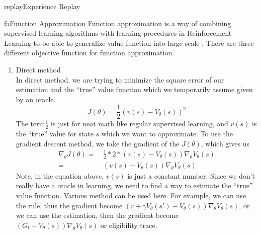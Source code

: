 \documentclass[9pt]{article}
\begin{document}
\begin{topic}{replay}{Experience Replay}
\citep{Vanseijen2015Deeper} \citep{Riedmiller2005Neural}
\end{topic}

\begin{topic}{fa}{Function Approximation}
Function approximation is a way of combining supervised learning algorithms with learning procedures in Reinforcement Learning to be able to generalize value function into large scale . There are three different objective function for function approximation. 
\begin{enumerate}
\item Direct method\\
In direct method, we are trying to minimize the square error of our estimation and the ``true'' value function which we temporarily assume given by an oracle.
\[
J(\theta) = \frac{1}{2}(v(s) - V_{\theta}(s))^2
\]
The term$\frac{1}{2}$ is just for neat math like regular supervised learning, and $v(s)$ is the ``true'' value for state $s$ which we want to approximate. To use the gradient descent method, we take the gradient of the $J(\theta)$, which gives us
\[
\begin{split}
\nabla_{\theta} J(\theta) = &\ \frac{1}{2} * 2 * (v(s) - V_{\theta}(s)) \nabla_{\theta} V_{\theta}(s)\\
= &\ (v(s) - V_{\theta}(s)) \nabla_{\theta} V_{\theta}(s)
\end{split}
\]
Note, in the equation above, $v(s)$ is just a constant number. Since we don't really have a oracle in learning, we need to find a way to estimate the ``true'' value function. Various method can be used here. For example, we can use the  rule, thus the gradient become $(r + \gamma V_{\theta}(s') - V_{\theta}(s)) \nabla_{\theta} V_{\theta}(s)$, or we can use the  estimation, then the gradient become $(G_t - V_{\theta}(s)) \nabla_{\theta} V_{\theta}(s)$ or eligibility trace.


\end{enumerate}
\end{topic}
\end{document}
